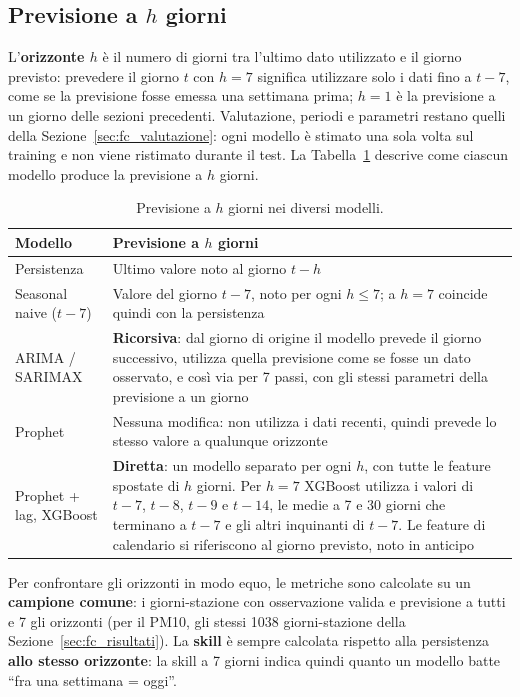 \documentclass[11pt]{report}
\begin{document}
\subsection{Previsione a $h$ giorni}
L'\textbf{orizzonte $h$} è il numero di giorni tra l'ultimo dato utilizzato e il
giorno previsto: prevedere il giorno $t$ con $h=7$ significa utilizzare solo i dati
fino a $t-7$, come se la previsione fosse emessa una settimana prima; $h=1$ è la
previsione a un giorno delle sezioni precedenti. Valutazione, periodi e parametri
restano quelli della Sezione~\ref{sec:fc_valutazione}: ogni modello è stimato una
sola volta sul training e non viene ristimato durante il test. La
Tabella~\ref{tab:fc_h} descrive come ciascun modello produce la previsione a $h$
giorni.

\begin{table}[H]
  \centering
  \caption{Previsione a $h$ giorni nei diversi modelli.}
  \label{tab:fc_h}
  \small
  \begin{tabularx}{\textwidth}{@{}>{\raggedright\arraybackslash}p{3cm} X@{}}
    \toprule
    \textbf{Modello} & \textbf{Previsione a $h$ giorni} \\
    \midrule
    Persistenza & Ultimo valore noto al giorno $t-h$ \\
    \addlinespace
    Seasonal naive ($t-7$) & Valore del giorno $t-7$, noto per ogni $h \le 7$; a $h=7$ coincide quindi con la persistenza \\
    \addlinespace
    ARIMA / SARIMAX & \textbf{Ricorsiva}: dal giorno di origine il modello prevede il giorno successivo, utilizza quella previsione come se fosse un dato osservato, e così via per 7 passi, con gli stessi parametri della previsione a un giorno \\
    \addlinespace
    Prophet & Nessuna modifica: non utilizza i dati recenti, quindi prevede lo stesso valore a qualunque orizzonte \\
    \addlinespace
    Prophet + lag, XGBoost & \textbf{Diretta}: un modello separato per ogni $h$, con tutte le feature spostate di $h$ giorni. Per $h=7$ XGBoost utilizza i valori di $t-7$, $t-8$, $t-9$ e $t-14$, le medie a 7 e 30 giorni che terminano a $t-7$ e gli altri inquinanti di $t-7$. Le feature di calendario si riferiscono al giorno previsto, noto in anticipo \\
    \bottomrule
  \end{tabularx}
\end{table}

Per confrontare gli orizzonti in modo equo, le metriche sono calcolate su un
\textbf{campione comune}: i giorni-stazione con osservazione valida e previsione a
tutti e 7 gli orizzonti (per il PM10, gli stessi \num{1038} giorni-stazione della
Sezione~\ref{sec:fc_risultati}). La \textbf{skill} è sempre calcolata rispetto alla
persistenza \textbf{allo stesso orizzonte}: la skill a 7 giorni indica quindi quanto
un modello batte ``fra una settimana = oggi''.
\end{document}
